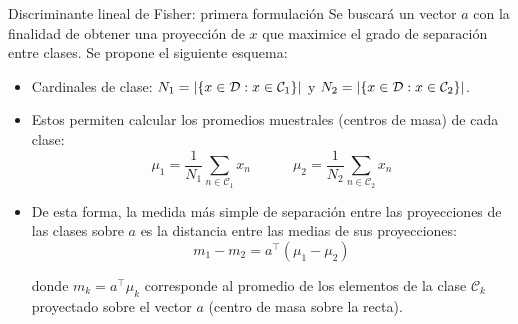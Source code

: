 \documentclass[9pt]{beamer}
\begin{document}
\begin{frame}{Discriminante lineal de Fisher: primera formulación}
Se buscará un vector $a$ con la finalidad de obtener una proyección de $x$ que maximice el grado de separación entre clases. Se propone el siguiente esquema:\pause

\begin{itemize}
	\item Cardinales de clase: $N_1 = |\{x\in{\mathcal D}:x\in{\mathcal C}_1\}|$ y $N_2 = |\{x\in{\mathcal D}:x\in{\mathcal C}_2\}|$.\pause
	\item Estos permiten calcular los promedios muestrales (centros de masa) de cada clase: 
\begin{equation*}
	\mu_1=\frac{1}{N_1}\sum_{n\in\mathcal{C}_1}x_n
	\quad\quad\quad
	\mu_2=\frac{1}{N_2}\sum_{n\in\mathcal{C}_2}x_n
\end{equation*}
\pause
	\item De esta forma, la medida más simple de separación entre las proyecciones de las clases sobre $a$ es la distancia entre las medias  de sus proyecciones:
\begin{equation*}
	m_1 - m_2 = a^\top(\mu_1-\mu_2)
\end{equation*}

donde $m_k= a^\top\mu_k$ corresponde al promedio de los elementos de  la clase $\mathcal{C}_k$ proyectado sobre el  vector $a$ (centro de masa sobre la recta).
	
\end{itemize}

\end{frame}
\end{document}
